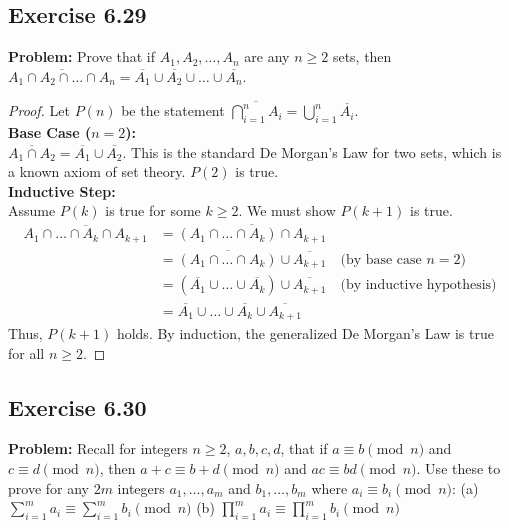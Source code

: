 \documentclass[11pt, a4paper]{article}
\theoremstyle{definition}
\theoremstyle{remark}
\begin{document}
\subsection{Exercise 6.29}
\textbf{Problem:} Prove that if $A_1, A_2, \dots, A_n$ are any $n \ge 2$ sets, then $\overline{A_1 \cap A_2 \cap \dots \cap A_n} = \overline{A_1} \cup \overline{A_2} \cup \dots \cup \overline{A_n}$.

\begin{proof}
Let $P(n)$ be the statement $\overline{\bigcap_{i=1}^n A_i} = \bigcup_{i=1}^n \overline{A_i}$.
\vspace{4pt} \\
\textbf{Base Case ($n = 2$):} \\
$\overline{A_1 \cap A_2} = \overline{A_1} \cup \overline{A_2}$. This is the standard De Morgan's Law for two sets, which is a known axiom of set theory. $P(2)$ is true.
\vspace{4pt} \\
\textbf{Inductive Step:} \\
Assume $P(k)$ is true for some $k \ge 2$. We must show $P(k+1)$ is true.
\begin{align*}
\overline{A_1 \cap \dots \cap A_k \cap A_{k+1}} &= \overline{(A_1 \cap \dots \cap A_k) \cap A_{k+1}} \\
&= \overline{(A_1 \cap \dots \cap A_k)} \cup \overline{A_{k+1}} \quad \text{(by base case $n=2$)} \\
&= (\overline{A_1} \cup \dots \cup \overline{A_k}) \cup \overline{A_{k+1}} \quad \text{(by inductive hypothesis)} \\
&= \overline{A_1} \cup \dots \cup \overline{A_k} \cup \overline{A_{k+1}}
\end{align*}
Thus, $P(k+1)$ holds. By induction, the generalized De Morgan's Law is true for all $n \ge 2$.
\end{proof}

\subsection{Exercise 6.30}
\textbf{Problem:} Recall for integers $n \ge 2$, $a, b, c, d$, that if $a \equiv b \pmod n$ and $c \equiv d \pmod n$, then $a+c \equiv b+d \pmod n$ and $ac \equiv bd \pmod n$. Use these to prove for any $2m$ integers $a_1, \dots, a_m$ and $b_1, \dots, b_m$ where $a_i \equiv b_i \pmod n$:
(a) $\sum_{i=1}^m a_i \equiv \sum_{i=1}^m b_i \pmod n$
(b) $\prod_{i=1}^m a_i \equiv \prod_{i=1}^m b_i \pmod n$
\end{document}
